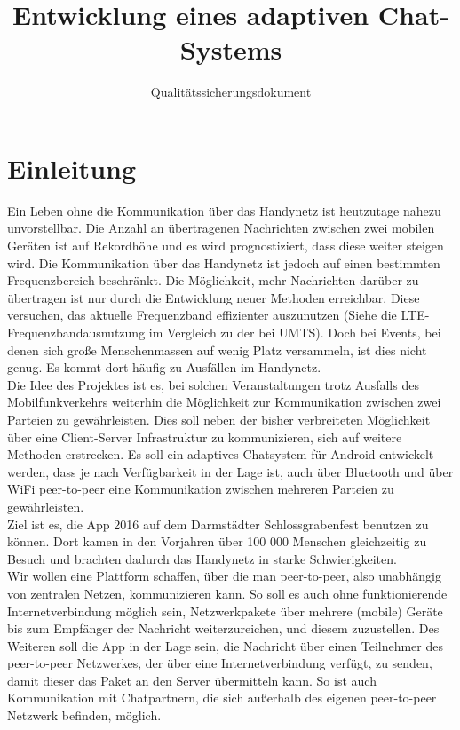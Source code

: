 \documentclass[accentcolor=tud0b,12pt,paper=a4]{tudreport}
\title{Entwicklung eines adaptiven Chat-Systems}
\subtitle{Qualitätssicherungsdokument}
\begin{document}
	\maketitle
	\tableofcontents 
	
	\chapter{Einleitung}
		Ein Leben ohne die Kommunikation über das Handynetz ist heutzutage nahezu unvorstellbar. Die Anzahl an übertragenen Nachrichten zwischen zwei mobilen Geräten ist auf Rekordhöhe und es wird prognostiziert, dass diese weiter steigen wird. Die Kommunikation über das Handynetz ist jedoch auf einen bestimmten Frequenzbereich beschränkt. Die Möglichkeit, mehr Nachrichten darüber zu übertragen ist nur durch die Entwicklung neuer Methoden erreichbar. Diese versuchen, das aktuelle Frequenzband effizienter auszunutzen (Siehe die LTE-Frequenzbandausnutzung im Vergleich zu der bei UMTS). Doch bei Events, bei denen sich große Menschenmassen auf wenig Platz versammeln, ist dies nicht genug. Es kommt dort häufig zu Ausfällen im Handynetz. \\

		Die Idee des Projektes ist es, bei solchen Veranstaltungen trotz Ausfalls des Mobilfunkverkehrs weiterhin die Möglichkeit zur Kommunikation zwischen zwei Parteien zu gewährleisten. Dies soll neben der bisher verbreiteten Möglichkeit über eine Client-Server Infrastruktur zu kommunizieren, sich auf weitere Methoden erstrecken. Es soll ein adaptives Chatsystem für Android entwickelt werden, dass je nach Verfügbarkeit in der Lage ist, auch über Bluetooth und über WiFi peer-to-peer eine Kommunikation zwischen mehreren Parteien zu gewährleisten. \\

		Ziel ist es, die App 2016 auf dem Darmstädter Schlossgrabenfest benutzen zu können. Dort kamen in den Vorjahren über 100 000 Menschen gleichzeitig zu Besuch und brachten dadurch das Handynetz in starke Schwierigkeiten.\\

		Wir wollen eine Plattform schaffen, über die man peer-to-peer, also unabhängig von zentralen Netzen, kommunizieren kann. So soll es auch ohne funktionierende Internetverbindung möglich sein, Netzwerkpakete über mehrere (mobile) Geräte bis zum Empfänger der Nachricht weiterzureichen, und diesem zuzustellen. Des Weiteren soll die App in der Lage sein, die Nachricht über einen Teilnehmer des peer-to-peer Netzwerkes, der über eine Internetverbindung verfügt, zu senden, damit dieser das Paket an den Server übermitteln kann. So ist auch Kommunikation mit Chatpartnern, die sich außerhalb des eigenen peer-to-peer Netzwerk befinden, möglich.\\
\end{document}
